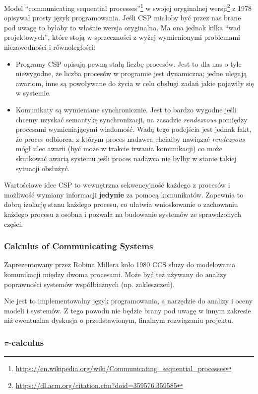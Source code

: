 \documentclass[11pt,oneside,a4paper,titlepage,onecolumn]{article}
\begin{document}
Model ``communicating sequential
processes''\footnote{\url{https://en.wikipedia.org/wiki/Communicating_sequential_processes}}
w swojej oryginalnej wersji\footnote{\url{https://dl.acm.org/citation.cfm?doid=359576.359585}} z 1978
opisywał prosty język programowania.
Jeśli CSP miałoby być przez nas brane pod uwagę to byłaby to właśnie wersja oryginalna. Ma ona jednak
kilka ``wad projektowych'', które stoją w sprzeczności z wyżej wymienionymi problemami niezawodności i
równoległości:

\begin{itemize}
\item Programy CSP opisują pewną stałą liczbę procesów. Jest to dla nas o tyle niewygodne, że liczba
    procesów w programie jest dynamiczna; jedne ulegają awariom, inne są powoływane do życia w celu
    obsługi zadań jakie pojawiły się w systemie.
\item Komunikaty są wymieniane synchronicznie. Jest to bardzo wygodne jeśli chcemy uzyskać semantykę
    synchronizacji, na zasadzie \emph{rendezvous} pomiędzy procesami wymieniającymi wiadomość.
    Wadą tego podejścia jest jednak fakt, że proces odbiorca, z którym proces nadawca chciałby nawiązać
    \emph{rendezvous} mógł ulec awarii (być może w trakcie trwania komunikacji) co może skutkować
    awarią systemu jeśli proces nadawca nie byłby w stanie takiej sytuacji obsłużyć.
\end{itemize}

Wartościowe idee CSP to wewnętrzna sekwencyjność każdego z procesów i możliwość wymiany informacji
\textbf{jedynie} za pomocą komunikatów. Zapewnia to dobrą izolację stanu każdego procesu, co ułatwia
wnioskowanie o zachowaniu każdego procesu z osobna i pozwala na budowanie systemów ze sprawdzonych
części.

\subsubsection{Calculus of Communicating Systems}

Zaprezentowany przez Robina Millera koło 1980 CCS służy do modelowania komunikacji między dwoma
procesami. Może być też używany do analizy poprawności systemów współbieżnych (np. zakleszczeń).

Nie jest to implementowalny język programowania, a narzędzie do analizy i oceny modeli i systemów.
Z tego powodu nie będzie brany pod uwagę w innym zakresie niż ewentualna dyskusja o przedstawionym, finalnym
rozwiązaniu projektu.

\subsubsection{$\pi$-calculus}
\end{document}
